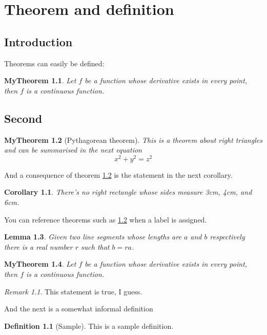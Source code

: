 \documentclass{report}
\newtheorem{theorem}{MyTheorem}[chapter]
\newtheorem{corollary}{Corollary}[theorem]
\newtheorem{lemma}[theorem]{Lemma}
\theoremstyle{definition}
\newtheorem{definition}{Definition}[chapter]
\theoremstyle{remark}
\newtheorem*{remark}{Remark}
\begin{document}
\chapter{Theorem and definition}
\section{Introduction}
Theorems can easily be defined:

\begin{theorem}
Let \(f\) be a function whose derivative exists in every point, then \(f\) is a continuous function.
\end{theorem}

\section{Second}
\begin{theorem}[Pythagorean theorem]
\label{pythagorean}
This is a theorem about right triangles and can be summarised in the next 
equation \[ x^2 + y^2 = z^2 \]
\end{theorem}

And a consequence of theorem \ref{pythagorean} is the statement in the next 
corollary.

\begin{corollary}
There's no right rectangle whose sides measure 3cm, 4cm, and 6cm.
\end{corollary}

You can reference theorems such as \ref{pythagorean} when a label is assigned.

\begin{lemma}
Given two line segments whose lengths are \(a\) and \(b\) respectively there is a 
real number \(r\) such that \(b=ra\).
\end{lemma}

\begin{theorem}
Let \(f\) be a function whose derivative exists in every point, then \(f\) is a continuous function.
\end{theorem}

\begin{remark}
This statement is true, I guess.
\end{remark}

And the next is a somewhat informal definition

\begin{definition}[Sample]
This is a sample definition.
\end{definition}
\end{document}
